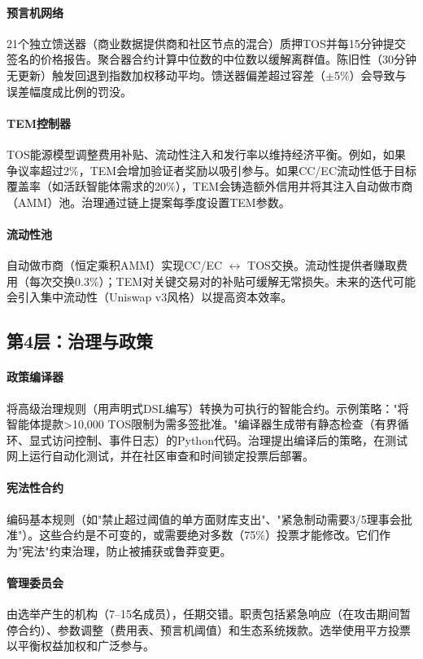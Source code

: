 \documentclass[11pt]{article}
\begin{document}
\paragraph{预言机网络} 21个独立馈送器（商业数据提供商和社区节点的混合）质押TOS并每15分钟提交签名的价格报告。聚合器合约计算中位数的中位数以缓解离群值。陈旧性（30分钟无更新）触发回退到指数加权移动平均。馈送器偏差超过容差（$\pm$5\%）会导致与误差幅度成比例的罚没。

\paragraph{TEM控制器} TOS能源模型调整费用补贴、流动性注入和发行率以维持经济平衡。例如，如果争议率超过2\%，TEM会增加验证者奖励以吸引参与。如果CC/EC流动性低于目标覆盖率（如活跃智能体需求的20\%），TEM会铸造额外信用并将其注入自动做市商（AMM）池。治理通过链上提案每季度设置TEM参数。

\paragraph{流动性池} 自动做市商（恒定乘积AMM）实现CC/EC $\leftrightarrow$ TOS交换。流动性提供者赚取费用（每次交换0.3\%）；TEM对关键交易对的补贴可缓解无常损失。未来的迭代可能会引入集中流动性（Uniswap v3风格）以提高资本效率。

\subsection{第4层：治理与政策}
\paragraph{政策编译器} 将高级治理规则（用声明式DSL编写）转换为可执行的智能合约。示例策略："将智能体提款>10,000 TOS限制为需多签批准。"编译器生成带有静态检查（有界循环、显式访问控制、事件日志）的Python代码。治理提出编译后的策略，在测试网上运行自动化测试，并在社区审查和时间锁定投票后部署。

\paragraph{宪法性合约} 编码基本规则（如"禁止超过阈值的单方面财库支出"、"紧急制动需要3/5理事会批准"）。这些合约是不可变的，或需要绝对多数（75\%）投票才能修改。它们作为"宪法"约束治理，防止被捕获或鲁莽变更。

\paragraph{管理委员会} 由选举产生的机构（7--15名成员），任期交错。职责包括紧急响应（在攻击期间暂停合约）、参数调整（费用表、预言机阈值）和生态系统拨款。选举使用平方投票以平衡权益加权和广泛参与。
\end{document}
